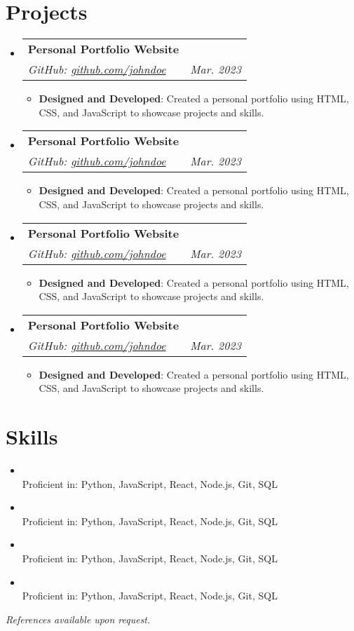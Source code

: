 \documentclass[a4paper,10pt]{article}
\makeatletter
\newcommand{\resumeItem}[2]{
  \item\small{
    \textbf{#1}{: #2 \vspace{-2pt}}
  }
}
\newcommand{\resumeSubheading}[4]{
  \vspace{-2pt}\item
    \begin{tabular*}{0.97\textwidth}[t]{l@{\extracolsep{\fill}}r}
      \textbf{#1} & #2 \\
      \textit{#3} & \textit{#4} \\
    \end{tabular*}\vspace{-7pt}
}
\newcommand{\resumeSubSubheading}[2]{
    \item\small{
        \textbf{#1}\vspace{-2pt}\\#2
    }
}
\newcommand{\resumeSubHeadingListStart}{\begin{itemize}[leftmargin=0.15in, label={}]}
\newcommand{\resumeSubHeadingListEnd}{\end{itemize}\vspace{-12pt}}
\newcommand{\resumeItemListStart}{\begin{itemize}}
\newcommand{\resumeItemListEnd}{\end{itemize}\vspace{-12pt}}
\makeatother
\begin{document}
\section{Projects}
  \resumeSubHeadingListStart
    \resumeSubheading
      {Personal Portfolio Website}{}
      {GitHub: \href{https://github.com/johndoe}{github.com/johndoe}}{Mar. 2023}
      \resumeItemListStart
        \resumeItem{Designed and Developed}
          {Created a personal portfolio using HTML, CSS, and JavaScript to showcase projects and skills.}
      \resumeItemListEnd
  \resumeSubHeadingListEnd
  \vspace{20pt}
  \resumeSubHeadingListStart
    \resumeSubheading
      {Personal Portfolio Website}{}
      {GitHub: \href{https://github.com/johndoe}{github.com/johndoe}}{Mar. 2023}
      \resumeItemListStart
        \resumeItem{Designed and Developed}
          {Created a personal portfolio using HTML, CSS, and JavaScript to showcase projects and skills.}
      \resumeItemListEnd
  \resumeSubHeadingListEnd
  \vspace{20pt}
  \resumeSubHeadingListStart
    \resumeSubheading
      {Personal Portfolio Website}{}
      {GitHub: \href{https://github.com/johndoe}{github.com/johndoe}}{Mar. 2023}
      \resumeItemListStart
        \resumeItem{Designed and Developed}
          {Created a personal portfolio using HTML, CSS, and JavaScript to showcase projects and skills.}
      \resumeItemListEnd
  \resumeSubHeadingListEnd
  \vspace{20pt}
  \resumeSubHeadingListStart
    \resumeSubheading
      {Personal Portfolio Website}{}
      {GitHub: \href{https://github.com/johndoe}{github.com/johndoe}}{Mar. 2023}
      \resumeItemListStart
        \resumeItem{Designed and Developed}
          {Created a personal portfolio using HTML, CSS, and JavaScript to showcase projects and skills.}
      \resumeItemListEnd
  \resumeSubHeadingListEnd

\section{Skills}
  \resumeSubHeadingListStart
    \resumeSubSubheading{}{Proficient in: Python, JavaScript, React, Node.js, Git, SQL}
    \resumeSubSubheading{}{Proficient in: Python, JavaScript, React, Node.js, Git, SQL}
    \resumeSubSubheading{}{Proficient in: Python, JavaScript, React, Node.js, Git, SQL}
    \resumeSubSubheading{}{Proficient in: Python, JavaScript, React, Node.js, Git, SQL}
  \resumeSubHeadingListEnd

\begin{center}
    \vspace{4pt}
    \textit{References available upon request.}
\end{center}
\end{document}
